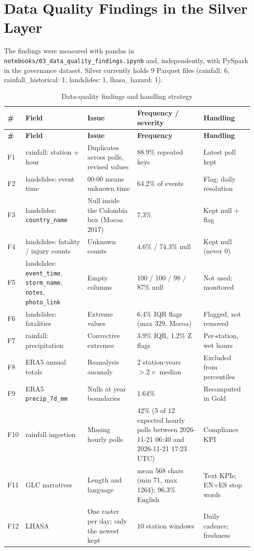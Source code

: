 \documentclass[11pt,a4paper]{article}
\begin{document}
\section{Data Quality Findings in the Silver Layer}
The findings were measured with pandas in \texttt{notebooks/\allowbreak{}03\_\allowbreak{}data\_\allowbreak{}quality\_\allowbreak{}findings.\allowbreak{}ipynb} and, independently, with PySpark
in the governance dataset. Silver currently holds 9 Parquet files (rainfall: 6, rainfall\_historical: 1, landslides: 1, lhasa\_hazard: 1).
\begin{longtable}{p{0.4cm}p{3.6cm}p{3.4cm}p{4.0cm}p{3.4cm}}
\caption{Data-quality findings and handling strategy}\label{tab:findings}\\\toprule
\textbf{\#} & \textbf{Field} & \textbf{Issue} & \textbf{Frequency / severity} & \textbf{Handling}\\\midrule\endfirsthead
\toprule\textbf{\#} & \textbf{Field} & \textbf{Issue} & \textbf{Frequency} & \textbf{Handling}\\\midrule\endhead
F1 & rainfall: station + hour & Duplicates across polls, revised values & 88.9\% repeated keys & Latest poll kept\\
F2 & landslides: event time & 00:00 means unknown time & 64.2\% of events & Flag; daily resolution\\
F3 & landslides: \texttt{country\_\allowbreak{}name} & Null inside the Colombia box (Mocoa 2017) & 7.3\% & Kept null + flag\\
F4 & landslides: fatality / injury counts & Unknown counts & 4.6\% / 74.3\% null & Kept null (never 0)\\
F5 & landslides: \texttt{event\_\allowbreak{}time}, \texttt{storm\_\allowbreak{}name}, \texttt{notes}, \texttt{photo\_\allowbreak{}link} & Empty columns & 100 / 100 / 98 / 87\% null & Not used; monitored\\
F6 & landslides: fatalities & Extreme values & 6.4\% IQR flags (max 329, Mocoa) & Flagged, not removed\\
F7 & rainfall: precipitation & Convective extremes & 3.9\% IQR, 1.2\% Z flags & Per-station, wet hours\\
F8 & ERA5 annual totals & Reanalysis anomaly & 2 station-years $>2\times$ median & Excluded from percentiles\\
F9 & ERA5 \texttt{precip\_\allowbreak{}7d\_\allowbreak{}mm} & Nulls at year boundaries & 1.64\% & Recomputed in Gold\\
F10 & rainfall ingestion & Missing hourly polls & 42\% (5 of 12 expected hourly polls between 2026-11-21 06:40 and 2026-11-21 17:23 UTC) & Compliance KPI\\
F11 & GLC narratives & Length and language & mean 568 chars (min 71, max 1264); 96.3\% English & Text KPIs; EN+ES stop words\\
F12 & LHASA & One raster per day; only the newest kept & 10 station windows & Daily cadence; freshness\\
\bottomrule
\end{longtable}
\end{document}
